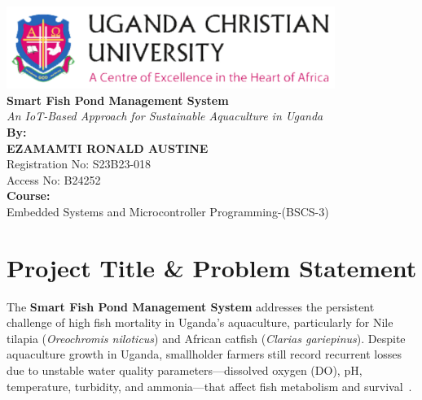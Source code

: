 \documentclass[12pt,a4paper]{article}
\begin{document}
\begin{titlepage}
    \centering
    \includegraphics[width=0.8\textwidth]{img/UCU.png}\\[1cm]
    
    {\Huge\bfseries Smart Fish Pond Management System}\\[1cm]
    {\LARGE\itshape  An IoT-Based Approach for Sustainable
 Aquaculture in Uganda}\\[1.5cm]
    
    {\Large\textbf{By:}}\\[1.2cm]
    {\Large\textbf{EZAMAMTI RONALD AUSTINE}}\\[0.5cm]
    {\large Registration No: S23B23-018}\\[0.5cm]
    {\large Access No: B24252}\\[1cm]
    
    {\Large\textbf{Course:} \\Embedded Systems and Microcontroller Programming-(BSCS-3)}\\[0.5cm]
    
\end{titlepage}

\renewcommand{\contentsname}{Table of Contents}
\tableofcontents
\clearpage


\section{Project Title \& Problem Statement}
The \textbf{Smart Fish Pond Management System} addresses the persistent challenge of high fish mortality in Uganda's aquaculture, particularly for Nile tilapia (\textit{Oreochromis niloticus}) and African catfish (\textit{Clarias gariepinus}). Despite aquaculture growth in Uganda, smallholder farmers still record recurrent losses due to unstable water quality parameters—dissolved oxygen (DO), pH, temperature, turbidity, and ammonia—that affect fish metabolism and survival~\cite{tumwesigye2022effect, mramba2023pond}.
\end{document}
